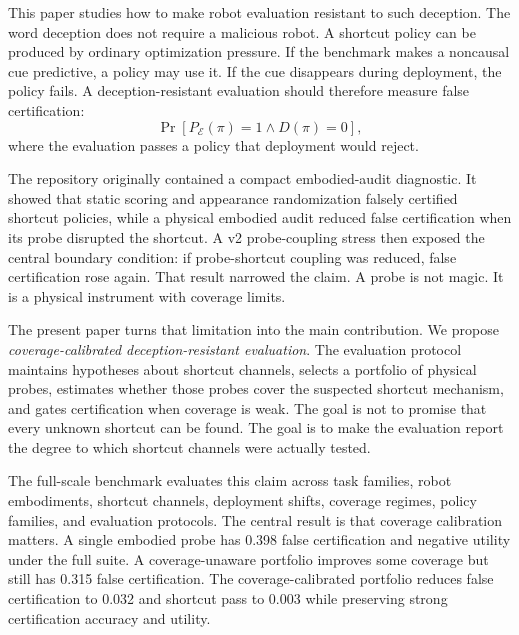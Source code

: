 \documentclass{article}
\newcommand{\policy}{\pi}
\newcommand{\deploy}{D}
\newcommand{\pass}{P}
\newcommand{\protocol}{\mathcal{E}}
\begin{document}
This paper studies how to make robot evaluation resistant to such deception. The word deception does not require a malicious robot. A shortcut policy can be produced by ordinary optimization pressure. If the benchmark makes a noncausal cue predictive, a policy may use it. If the cue disappears during deployment, the policy fails. A deception-resistant evaluation should therefore measure false certification:
\[
\Pr[\pass_{\protocol}(\policy)=1 \land \deploy(\policy)=0],
\]
where the evaluation passes a policy that deployment would reject.

The repository originally contained a compact embodied-audit diagnostic. It showed that static scoring and appearance randomization falsely certified shortcut policies, while a physical embodied audit reduced false certification when its probe disrupted the shortcut. A v2 probe-coupling stress then exposed the central boundary condition: if probe-shortcut coupling was reduced, false certification rose again. That result narrowed the claim. A probe is not magic. It is a physical instrument with coverage limits.

The present paper turns that limitation into the main contribution. We propose \emph{coverage-calibrated deception-resistant evaluation}. The evaluation protocol maintains hypotheses about shortcut channels, selects a portfolio of physical probes, estimates whether those probes cover the suspected shortcut mechanism, and gates certification when coverage is weak. The goal is not to promise that every unknown shortcut can be found. The goal is to make the evaluation report the degree to which shortcut channels were actually tested.

The full-scale benchmark evaluates this claim across task families, robot embodiments, shortcut channels, deployment shifts, coverage regimes, policy families, and evaluation protocols. The central result is that coverage calibration matters. A single embodied probe has 0.398 false certification and negative utility under the full suite. A coverage-unaware portfolio improves some coverage but still has 0.315 false certification. The coverage-calibrated portfolio reduces false certification to 0.032 and shortcut pass to 0.003 while preserving strong certification accuracy and utility.
\end{document}
